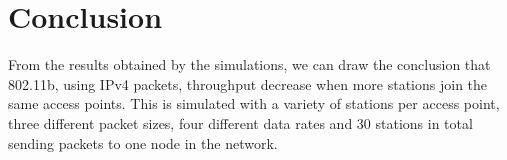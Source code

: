 \chapter{Conclusion} 

From the results obtained by the simulations, we can draw the conclusion that 802.11b, using IPv4 packets, throughput decrease when more stations join the same access points. This is simulated with a variety of stations per access point, three different packet sizes, four different data rates and 30 stations in total sending packets to one node in the network.




